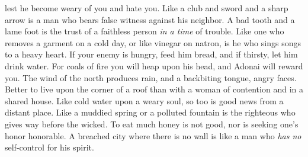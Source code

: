 \begin{biblechapter}
lest he become weary of you and hate you.
\verse Like a club and sword and a sharp arrow 
is a man who bears false witness against his neighbor.
\verse A bad tooth and a lame foot 
is the trust of a faithless person \textit{in a time} of trouble.
\verse Like one who removes a garment on a cold day, or like vinegar on natron, 
is he who sings songs to a heavy heart.
\verse If your enemy is hungry, feed him bread, 
and if thirsty, let him drink water.
\verse For coals of fire you will heap upon his head, 
and Adonai will reward you.
\verse The wind of the north produces rain, 
and a backbiting tongue, angry faces.
\verse Better to live upon the corner of a roof 
than with a woman of contention and in a shared house.
\verse Like cold water upon a weary soul, 
so too is good news from a distant place.
\verse Like a muddied spring or a polluted fountain 
is the righteous who gives way before the wicked.
\verse To eat much honey is not good, 
nor is seeking one’s honor honorable.
\verse A breached city where there is no wall 
is like a man who \textit{has no} self-control for his spirit.
\end{biblechapter}

